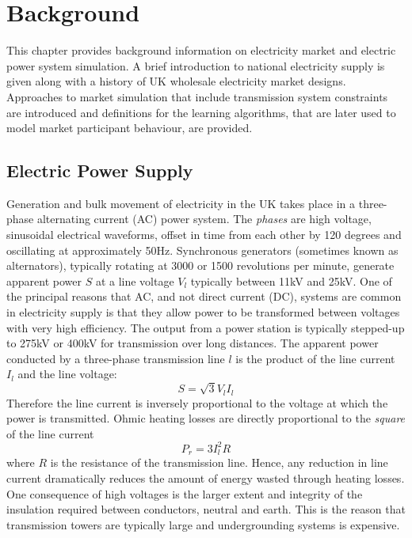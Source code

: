 \chapter{Background}
\label{ch:background}
This chapter provides background information on electricity market and electric
power system simulation. A brief introduction to national electricity supply is
given along with a history of UK wholesale electricity market designs.
Approaches to market simulation that include transmission system
constraints are introduced and definitions for the learning algorithms,
that are later used to model market participant behaviour, are provided.

\section{Electric Power Supply}


Generation and bulk movement of electricity in the UK takes place in a
three-phase alternating current (AC) power system.  The \textit{phases} are high
voltage, sinusoidal electrical waveforms, offset in time from each other by 120
degrees and oscillating at approximately 50Hz. Synchronous generators (sometimes
known as alternators), typically rotating at 3000 or 1500 revolutions per
minute, generate apparent power $S$ at a line voltage $V_l$ typically between
11kV and 25kV.  One of the principal reasons that AC, and not direct current
(DC), systems are common in electricity supply is that they allow power to be
transformed between voltages with very high efficiency. The output from a power
station is typically stepped-up to 275kV or 400kV for transmission over long
distances. The apparent power conducted by a three-phase transmission line $l$
is the product of the line current $I_l$ and the line voltage:
\begin{equation}
S = \sqrt{3} V_l I_l
\end{equation}
Therefore the line current is inversely proportional to the voltage at which
the power is transmitted. Ohmic heating losses are directly proportional to the
\textit{square} of the line current
\begin{equation}
P_{r} = 3 I_l^2 R
\end{equation}
where $R$ is the resistance of the transmission line.  Hence, any reduction in
line current dramatically reduces the amount of energy wasted through heating
losses.  One consequence of high voltages is the larger extent and integrity
of the insulation required between conductors, neutral and earth.  This is the
reason that transmission towers are typically large and undergrounding systems
is expensive.

